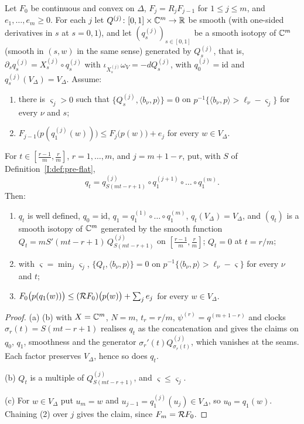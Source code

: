 \begin{lemma}\label{lem:fcp-composition}
Let $F_0$ be continuous and convex on $\Delta$, $F_j=R_jF_{j-1}$ for $1\le j\le m$, and $e_1,\dots,e_m\ge0$. For each
$j$ let $Q^{(j)}\colon[0,1]\times\mathbb{C}^m\to\mathbb{R}$ be smooth (with one-sided derivatives in $s$ at $s=0,1$), and let
$(q^{(j)}_s)_{s\in[0,1]}$ be a smooth isotopy of $\mathbb{C}^m$ (smooth in $(s,w)$ in the same sense) generated by $Q^{(j)}_s$,
that is, $\partial_sq^{(j)}_s=X^{(j)}_s\circ q^{(j)}_s$ with $\iota_{X^{(j)}_s}\omega_V=-dQ^{(j)}_s$, with
$q^{(j)}_0=\mathrm{id}$ and $q^{(j)}_s(V_\Delta)=V_\Delta$. Assume:
\begin{enumerate}[label=(\arabic*)]
\item there is $\varsigma_j>0$ such that
 $\{Q^{(j)}_s,\langle b_\nu,p\rangle\}=0$ on $p^{-1}\{\langle b_\nu,p\rangle>\ell_\nu-\varsigma_j\}$ for every $\nu$ and
 $s$;
\item $F_{j-1}\bigl(p(q^{(j)}_1(w))\bigr)\le F_j\bigl(p(w)\bigr)+e_j$ for every $w\in V_\Delta$.
\end{enumerate}
For $t\in[\frac{r-1}m,\frac rm]$, $r=1,\dots,m$, and $j=m+1-r$, put, with $S$ of Definition~\ref{I:def:pre-flat},
\[
 q_t=q^{(j)}_{S(mt-r+1)}\circ q^{(j+1)}_1\circ\dots\circ q^{(m)}_1 .
\]
Then:
\begin{enumerate}[label=(\alph*)]
\item $q_t$ is well defined, $q_0=\mathrm{id}$, $q_1=q^{(1)}_1\circ\dots\circ q^{(m)}_1$, $q_t(V_\Delta)=V_\Delta$, and
 $(q_t)$ is a smooth isotopy of $\mathbb{C}^m$ generated by the smooth function $Q_t=mS'(mt-r+1)\,Q^{(j)}_{S(mt-r+1)}$ on
 $[\frac{r-1}m,\frac rm]$; $Q_t=0$ at $t=r/m$;
\item with $\varsigma=\min_j\varsigma_j$, $\{Q_t,\langle b_\nu,p\rangle\}=0$ on
 $p^{-1}\{\langle b_\nu,p\rangle>\ell_\nu-\varsigma\}$ for every $\nu$ and $t$;
\item $F_0\bigl(p(q_1(w))\bigr)\le(\mathcal{R} F_0)\bigl(p(w)\bigr)+\sum_je_j$ for every $w\in V_\Delta$.
\end{enumerate}
\end{lemma}

\begin{proof}
(a) (b) with $X=\mathbb{C}^m$, $N=m$, $t_r=r/m$, $\psi^{(r)}=q^{(m+1-r)}$ and clocks $\sigma_r(t)=S(mt-r+1)$ realises $q_t$ as the concatenation and gives the claims on $q_0$, $q_1$, smoothness and the generator $\sigma_r'(t)Q^{(j)}_{\sigma_r(t)}$, which vanishes at the seams. Each factor preserves $V_\Delta$, hence so does $q_t$.

(b) $Q_t$ is a multiple of $Q^{(j)}_{S(mt-r+1)}$, and $\varsigma\le\varsigma_j$.

(c) For $w\in V_\Delta$ put $u_m=w$ and $u_{j-1}=q^{(j)}_1(u_j)\in V_\Delta$, so $u_0=q_1(w)$. Chaining (2) over $j$ gives the claim, since $F_m=\mathcal{R} F_0$.
\end{proof}

